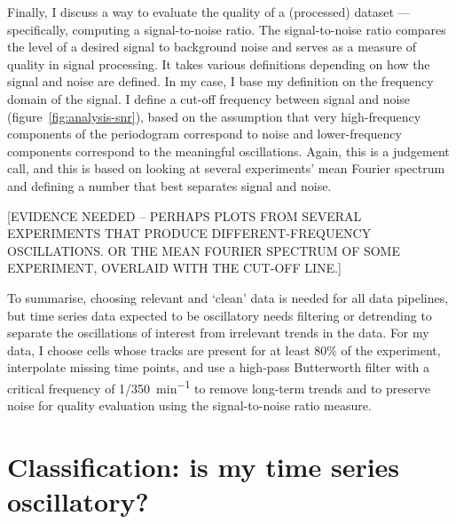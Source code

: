 Finally, I discuss a way to evaluate the quality of a (processed) dataset --- specifically, computing a signal-to-noise ratio.
The signal-to-noise ratio compares the level of a desired signal to background noise and serves as a measure of quality in signal processing.
It takes various definitions depending on how the signal and noise are defined.
In my case, I base my definition on the frequency domain of the signal.
I define a cut-off frequency between signal and noise (figure~\ref{fig:analysis-snr}), based on the assumption that very high-frequency components of the periodogram correspond to noise and lower-frequency components correspond to the meaningful oscillations.%
Again, this is a judgement call, and this is based on looking at several experiments' mean Fourier spectrum and defining a number that best separates signal and noise.

[EVIDENCE NEEDED -- PERHAPS PLOTS FROM SEVERAL EXPERIMENTS THAT PRODUCE DIFFERENT-FREQUENCY OSCILLATIONS.  OR THE MEAN FOURIER SPECTRUM OF SOME EXPERIMENT, OVERLAID WITH THE CUT-OFF LINE.]

To summarise, choosing relevant and `clean' data is needed for all data pipelines, but time series data expected to be oscillatory needs filtering or detrending to separate the oscillations of interest from irrelevant trends in the data.
For my data, I choose cells whose tracks are present for at least 80\% of the experiment, interpolate missing time points, and use a high-pass Butterworth filter with a critical frequency of \SI[parse-numbers=false]{1/350}{\minute^{-1}} to remove long-term trends and to preserve noise for quality evaluation using the signal-to-noise ratio measure.

\section[Classification]{Classification: is my time series oscillatory?}
\label{sec:analysis-classification}

